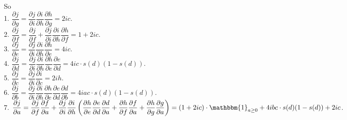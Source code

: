 \documentclass[10pt]{article}
\begin{document}
\begin{enumerate}[1.]
So\\
1. $\dfrac{\partial j}{\partial g}=\dfrac{\partial j}{\partial i}\dfrac{\partial i}{\partial h}\dfrac{\partial h}{\partial g}=2ic$.\\

2. $\dfrac{\partial j}{\partial f}=\dfrac{\partial j}{\partial f}+\dfrac{\partial j}{\partial i}\dfrac{\partial i}{\partial h}\dfrac{\partial h}{\partial f}=1+2ic$.\\

3. $\dfrac{\partial j}{\partial e}=\dfrac{\partial j}{\partial i}\dfrac{\partial i}{\partial h}\dfrac{\partial h}{\partial e}=4ic$.\\

4. $\dfrac{\partial j}{\partial d}=\dfrac{\partial j}{\partial i}\dfrac{\partial i}{\partial h}\dfrac{\partial h}{\partial e}\dfrac{\partial e}{\partial d}=4ic\cdot s(d)(1-s(d))$.\\

5. $\dfrac{\partial j}{\partial c}=\dfrac{\partial j}{\partial i}\dfrac{\partial i}{\partial c}=2ih$.\\

6. $\dfrac{\partial j}{\partial b}=\dfrac{\partial j}{\partial i}\dfrac{\partial i}{\partial h}\dfrac{\partial h}{\partial e}\dfrac{\partial e}{\partial d}\dfrac{\partial d}{\partial b}=4iac\cdot s(d)(1-s(d))$.\\

7. $\dfrac{\partial j}{\partial a}=
\dfrac{\partial j}{\partial f}\dfrac{\partial f}{\partial a}+
\dfrac{\partial j}{\partial i}\dfrac{\partial i}{\partial h}\left(
\dfrac{\partial h}{\partial e}\dfrac{\partial e}{\partial d}\dfrac{\partial d}{\partial a}+
\dfrac{\partial h}{\partial f}\dfrac{\partial f}{\partial a}+
\dfrac{\partial h}{\partial g}\dfrac{\partial g}{\partial a}
\right)
=(1+2ic)\cdot\mathbbm{1}_{a\geq 0}+4ibc\cdot s(d)(1-s(d))+2ic$.

\end{enumerate}
\end{document}
